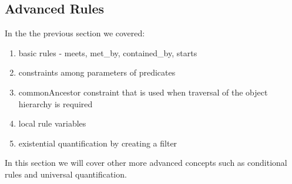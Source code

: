 \documentclass[10pt, letterpaper, twoside]{article}
\begin{document}
\subsection{Advanced Rules}
In the the previous section we covered:
\begin{enumerate}
\item basic rules - meets, met\_by, contained\_by, starts
\item constraints among parameters of predicates
\item commonAncestor constraint that is used when traversal of the object
hierarchy is required
\item local rule variables
\item existential quantification by creating a filter
\end{enumerate}
In this section we will cover other more advanced concepts such as
conditional rules and universal quantification.
\end{document}
